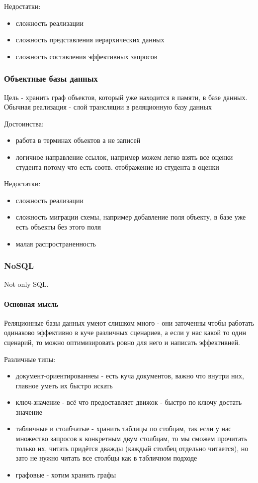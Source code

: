 Недостатки:
\begin{itemize}
    \item сложность реализации
    \item сложность представления иерархических данных
    \item сложность составления эффективных запросов
\end{itemize}

\subsubsection{Объектные базы данных}
Цель - хранить граф объектов, который уже находится
в памяти, в базе данных. Обычная реализация - слой
трансляции в реляционную базу данных

\enewline

Достоинства:
\begin{itemize}
    \item работа в терминах объектов а не записей
    \item логичное направление ссылок, например
можем легко взять все оценки студента потому что есть
соотв. отображение из студента в оценки
\end{itemize}

Недостатки:
\begin{itemize}
    \item сложность реализации
    \item сложность миграции схемы, например добавление
поля объекту, в базе уже есть объекты без этого поля
    \item малая распространенность
\end{itemize}

\subsubsection{NoSQL}
Not only SQL. \\
\paragraph{Основная мысль}
Реляционные базы данных умеют слишком много - они заточенны чтобы работать одинаково
эффективно в куче различных сценариев, а если у нас какой то один сценарий, то можно
оптимизировать ровно для него и написать эффективней.

\enewline

Различные типы:
\begin{itemize}
    \item  документ-ориентированнеы - есть куча документов, важно что внутри них, главное
уметь их быстро искать
    \item ключ-значение - всё что предоставляет движок - быстро по ключу достать значение
    \item табличные и столбчатые - хранить таблицы по стобцам, так если у нас множество
запросов к конкретным двум столбцам, то мы сможем прочитать только их, читать придётся
дважды (каждый столбец отдельно читается), но зато не нужно читать все столбцы как в
табличном подходе
    \item графовые - хотим хранить графы
\end{itemize}

